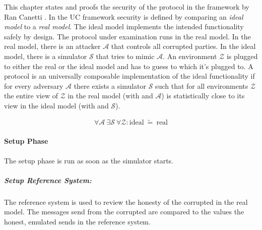\label{sec:security}

This chapter states and proofs the security of the protocol in the
 framework by Ran Canetti \cite{canetti05}.
In the UC framework security is defined by comparing an \emph{ideal model} to a
\emph{real model}. The ideal model implements the intended functionality
\JWfuncSym{}{} safely by design.  The protocol under examination runs in the
real model. In the real model, there is an attacker $\mathcal{A}$ that controls
all corrupted parties.  In the ideal model, there is a simulator $\mathcal{S}$
that tries to mimic $\mathcal{A}$. An environment $\mathcal{Z}$ is plugged to
either the real or the ideal model and has to guess to which it's plugged to. A
protocol \JWprotoSym{}{} is an universally composable implementation of the
ideal functionality if for every adversary $\mathcal{A}$ there exists a
simulator $\mathcal{S}$ such that for all environments $\mathcal{Z}$ the entire
view of $\mathcal{Z}$ in the real model (with \JWprotoSym{}{} and $\mathcal{A}$)
is statistically close to its view in the ideal model (with \JWfuncSym{}{} and
$\mathcal{S}$).

\begin{align*}
%
\forall \mathcal{A}\ \exists \mathcal{S}\ \forall \mathcal{Z} :
\text{ideal}\ \widetilde{=}\ \text{real}
%
\end{align*}

%
%
\label{sec:simulators}


\label{sec:simulator-david}

\paragraph{Setup Phase}

The setup phase is run as soon as the simulator starts.


\subparagraph{Setup Reference System:}

The reference system is used to review the honesty of the corrupted \JWpTwo{} in
the real model. The messages send from the corrupted \JWpTwo{} are compared
to the values the honest, emulated \JWpTwo{} sends in the reference system.

